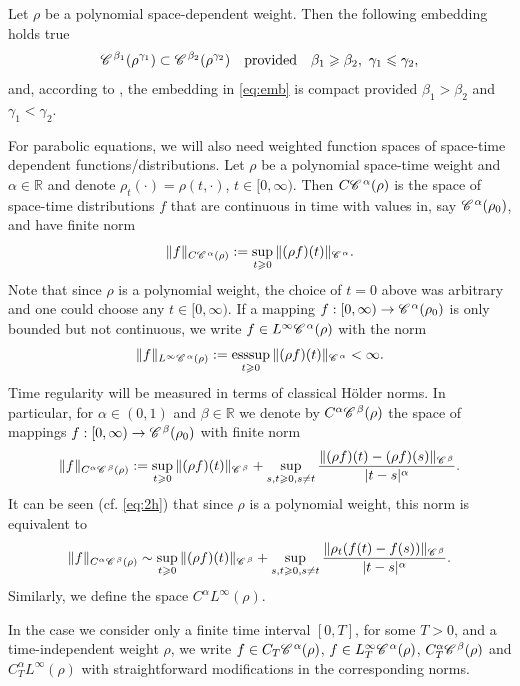 \documentclass[a4paper,11pt]{article}
\renewcommand{\geq}{\geqslant}
\numberwithin{equation}{section}
\newcommand{\CC}{\mathscr{C} \hspace{.1em}}
\newcommand{\R}{\mathbb{R}}
\newcommand{\8}{\infty}
\DeclareMathOperator{\esssup}{esssup}
\begin{document}
Let $\rho$ be a polynomial space-dependent weight. Then the following embedding holds true
\begin{equation}\label{eq:emb}
\CC^{\beta_1}(\rho^{\gamma_1})\subset \CC^{\beta_2}(\rho^{\gamma_2}) \quad\text{provided}\quad \beta_1\geq\beta_2,\ \gamma_1\leqslant \gamma_2,
\end{equation}
and, according to \cite[Theorem 6.31]{T06}, the embedding in \eqref{eq:emb} is compact provided  $ \beta_1>\beta_2$ and $\gamma_1< \gamma_2$.



For parabolic equations, we will also need weighted   function spaces of space-time dependent functions/distributions. Let $\rho$ be a polynomial space-time weight and $\alpha\in\R$ and denote $\rho_{t}(\cdot)=\rho(t,\cdot)$, $t\in[0,\8)$.  Then $C\CC^{\alpha}(\rho)$ is the space of space-time distributions $f$ that are continuous in time with values in, say $\CC^{\alpha}(\rho_{0})$, and have finite norm
\[
\|f\|_{C\CC^{\alpha}(\rho)}:=\sup_{t\geq 0} \|(\rho f)(t)\|_{\CC^{\alpha}}.
\]
Note that since $\rho$ is a polynomial weight, the choice of $t=0$ above was arbitrary and one could choose any $t\in[0,\infty)$. If a mapping $f:[0,\infty)\to  \CC^{\alpha}(\rho_{0}) $ is only bounded but not continuous, we write $f\in L^{\infty}\CC^{\alpha}(\rho)$ with the norm
\[
\|f\|_{L^{\infty}\CC^{\alpha}(\rho)}:=\esssup_{t\geq 0} \|(\rho f)(t)\|_{\CC^{\alpha}}<\8.
\]
Time regularity will be measured in terms of classical H\"older norms. In particular, for $\alpha\in(0,1)$ and $\beta\in\R$ we denote by $C^{\alpha}\CC^{\beta}(\rho)$  the space of mappings $f:[0,\infty)\to  \CC^{\beta}(\rho_{0}) $ with finite norm
$$
\|f\|_{C^{\alpha}\CC^{\beta}(\rho)}:=\sup_{t\geq 0} \|(\rho f)(t)\|_{\CC^{\beta}}+\sup_{s,t\geq 0,s\neq t} \frac{\|(\rho f)(t)-(\rho f)(s)\|_{\CC^{\beta}}}{|t-s|^{\alpha}}.
$$
It can be seen (cf. \eqref{eq:2h}) that since $\rho$ is a polynomial weight, this norm is equivalent to
\begin{equation}\label{eq:teq}
\|f\|_{C^{\alpha}\CC^{\beta}(\rho)}\sim\sup_{t\geq 0} \|(\rho f)(t)\|_{\CC^{\beta}}+\sup_{s,t\geq 0,s\neq t} \frac{\|\rho_{t}(f(t)- f(s))\|_{\CC^{\beta}}}{|t-s|^{\alpha}}.
\end{equation}
Similarly, we define the space $C^{\alpha}L^{\8}(\rho)$. 


In the case we consider only a finite time interval $[0,T]$, for some $T>0$, and a time-independent weight $\rho$, we write $f\in C_{T}\CC^{\alpha}(\rho)$, $f\in L^{\infty}_{T}\CC^{\alpha}(\rho)$, $C_{T}^{\alpha}\CC^{\beta}(\rho)$ and $C_{T}^{\alpha}L^{\8}(\rho)$ with straightforward modifications in the corresponding norms.
\end{document}
